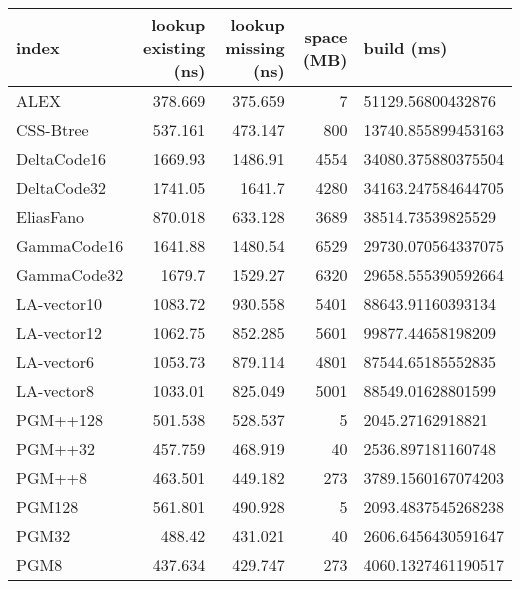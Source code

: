 \begin{tabular}{lrrrl}
\hline
 index             &   lookup existing (ns) &   lookup missing (ns) &   space (MB) & build (ms)         \\
\hline
 ALEX              &                378.669 &               375.659 &            7 & 51129.56800432876  \\
 CSS-Btree         &                537.161 &               473.147 &          800 & 13740.855899453163 \\
 DeltaCode16       &               1669.93  &              1486.91  &         4554 & 34080.375880375504 \\
 DeltaCode32       &               1741.05  &              1641.7   &         4280 & 34163.247584644705 \\
 EliasFano         &                870.018 &               633.128 &         3689 & 38514.73539825529  \\
 GammaCode16       &               1641.88  &              1480.54  &         6529 & 29730.070564337075 \\
 GammaCode32       &               1679.7   &              1529.27  &         6320 & 29658.555390592664 \\
 LA-vector10       &               1083.72  &               930.558 &         5401 & 88643.91160393134  \\
 LA-vector12       &               1062.75  &               852.285 &         5601 & 99877.44658198209  \\
 LA-vector6        &               1053.73  &               879.114 &         4801 & 87544.65185552835  \\
 LA-vector8        &               1033.01  &               825.049 &         5001 & 88549.01628801599  \\
 PGM++128          &                501.538 &               528.537 &            5 & 2045.27162918821   \\
 PGM++32           &                457.759 &               468.919 &           40 & 2536.897181160748  \\
 PGM++8            &                463.501 &               449.182 &          273 & 3789.1560167074203 \\
 PGM128            &                561.801 &               490.928 &            5 & 2093.4837545268238 \\
 PGM32             &                488.42  &               431.021 &           40 & 2606.6456430591647 \\
 PGM8              &                437.634 &               429.747 &          273 & 4060.1327461190517 \\

\end{tabular}
